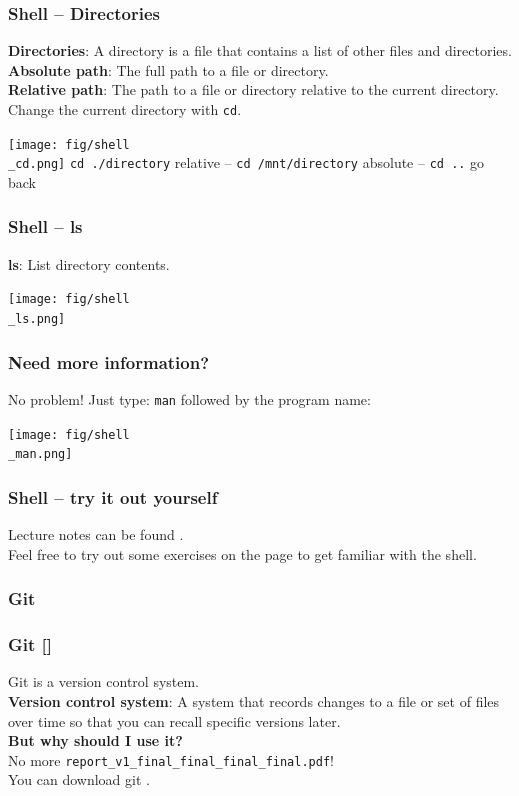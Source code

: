 \documentclass{beamer}
\begin{document}
\begin{frame}
  \frametitle{Shell -- Directories}
  \textbf{Directories}: A directory is a file that contains a list of other files and directories.\\
  \textbf{Absolute path}: The full path to a file or directory.\\
  \textbf{Relative path}: The path to a file or directory relative to the current directory.\\
  \vspace{5mm}
  Change the current directory with \texttt{cd}.\\
  \begin{center}
    \texttt{[image: fig/shell\\\_cd.png]}
    \texttt{cd ./directory} relative -- \texttt{cd /mnt/directory} absolute -- \texttt{cd ..} go back  
  \end{center}
\end{frame}
\begin{frame}
  \frametitle{Shell -- ls}
  \textbf{ls}: List directory contents.\\
  \begin{center}
    \texttt{[image: fig/shell\\\_ls.png]}
   \end{center}
\end{frame}
\begin{frame}
  \frametitle{Need more information?}
  No problem! Just type: \texttt{man} followed by the program name: 
  \begin{center}
    \texttt{[image: fig/shell\\\_man.png]}
   \end{center}
\end{frame}
\begin{frame}
  \frametitle{Shell -- try it out yourself}
  Lecture notes can be found .\\
  \vspace{5mm}
  Feel free to try out some exercises on the page to get familiar with the shell.\\
\end{frame}
\begin{frame}
  \frametitle{Git}

  

\end{frame}
\begin{frame}
  \frametitle{Git []}
  Git is a version control system.\\
  \vspace{5mm}
  \textbf{Version control system}: A system that records changes to a file or set of files over time so that you can recall specific versions later.\\
  \vspace{5mm}
  \textbf{But why should I use it?}\\
  No more \texttt{report\_v1\_final\_final\_final\_final.pdf}!\\
  \vspace{5mm}
  You can download git .
\end{frame}
\end{document}
